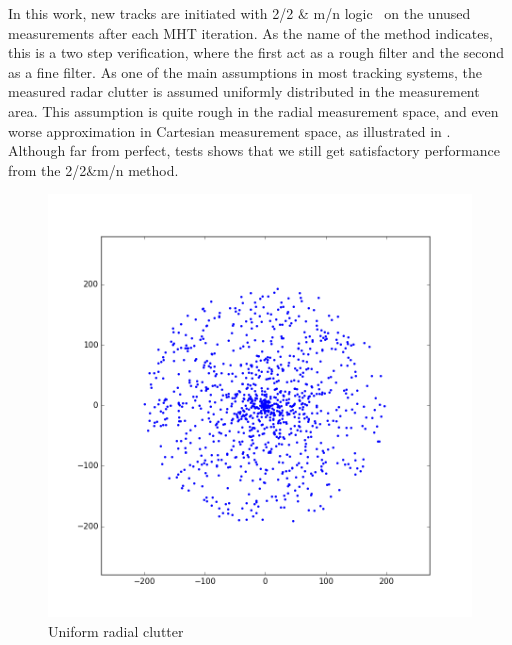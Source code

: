 In this work, new tracks are initiated with 2/2 \& m/n logic~\cite{Vo2015} on the unused measurements after each MHT iteration. As the name of the method indicates, this is a two step verification, where the first act as a rough filter and the second as a fine filter. As one of the main assumptions in most tracking systems, the measured radar clutter is assumed uniformly distributed in the measurement area. This assumption is quite rough in the radial measurement space, and even worse approximation in Cartesian measurement space, as illustrated in .  Although far from perfect, tests shows that we still get satisfactory performance from the 2/2\&m/n method.
\begin{figure}[H]
\centering
\begin{minipage}{0.45\textwidth}
\includegraphics[width=\textwidth]{Figures/clutterRadial.png}
\caption{Uniform radial clutter}\label{fig:clutter_radial}
\end{minipage}\hfill
\begin{minipage}{0.45\textwidth}

\end{minipage}
\end{figure}
